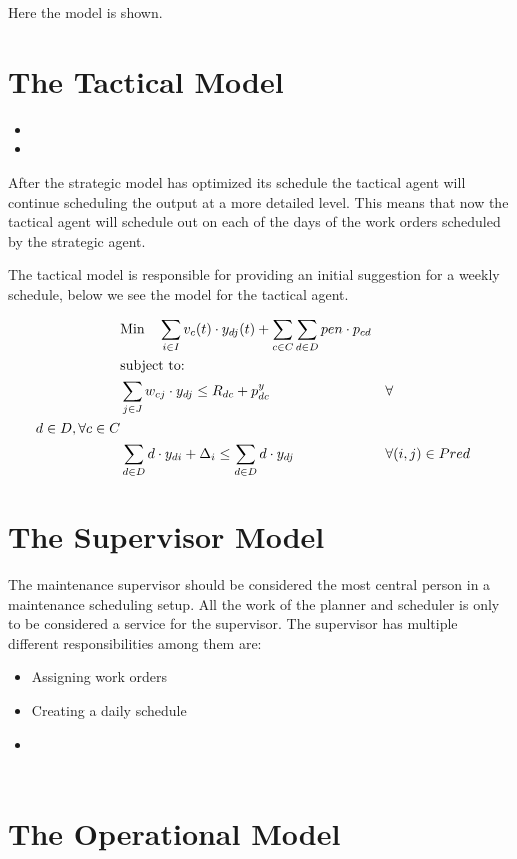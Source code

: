 Here the model is shown. 

\section{The Tactical Model}
\begin{itemize}
	\item 
	\item 
\end{itemize}
After the strategic model has optimized its schedule the tactical agent will continue scheduling the output at a more detailed level. This means that now the tactical agent will schedule 
out on each of the days of the work orders scheduled by the strategic agent. 

The tactical model is responsible for providing an initial suggestion for a weekly schedule, below we see the model for the tactical agent.

\begin{align}
	& \text{Min} \quad \sum_{i \in I} v_{c}(t) \cdot y_{dj}(t) + \sum_{c \in C} \sum_{d \in D} pen \cdot p_{cd}\\  
	& \text{subject to:} \notag \\
	& \sum_{j \in J} w_{cj} \cdot y_{dj} \leq R_{dc} + p^y_{dc} && \forall \\ d \in D, \forall c \in C \\ 
	& \sum_{d \in D} d \cdot y_{di} + \Delta_i \leq \sum_{d \in D} d \cdot y_{dj} && \forall (i, j) \in Pred \\ 
\end{align}

\section{The Supervisor Model}
The maintenance supervisor should be considered the most central person in a maintenance scheduling setup. All the work of the planner and scheduler is only to be considered a service for the supervisor.
The supervisor has multiple different responsibilities among them are: 

\begin{itemize}
	\item Assigning work orders
	\item Creating a daily schedule
	\item 
\end{itemize}

\begin{align}
    

\end{align}

\section{The Operational Model}



